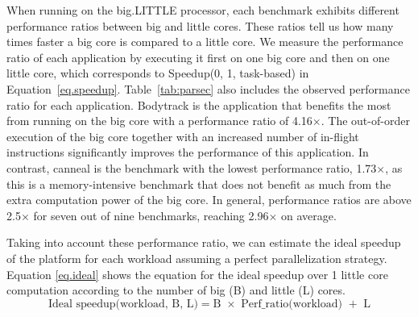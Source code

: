 When running on the big.LITTLE processor, each benchmark exhibits different performance ratios between big and little cores. These ratios tell us how many times faster a big core is compared to a little core. We measure the performance ratio of each application by executing it first on one big core and then on one little core, which corresponds to Speedup(0, 1, task-based) in Equation~\ref{eq.speedup}. 
Table~\ref{tab:parsec} also includes the observed performance ratio for each application. Bodytrack is the application that benefits the most from running on the big core with a performance ratio of 4.16$\times$. The out-of-order execution of the big core together with an increased number of in-flight instructions significantly improves the performance of this application. In contrast, canneal is the benchmark with the lowest performance ratio, 1.73$\times$, as this is a memory-intensive benchmark that does not benefit as much from the extra computation power of the big core. In general, performance ratios are above 2.5$\times$ for seven out of nine benchmarks, reaching 2.96$\times$ on average. 


Taking into account these performance ratio, we can estimate the ideal speedup of the platform for 
each workload assuming a perfect parallelization strategy. Equation \ref{eq.ideal} shows the 
equation for the ideal speedup over 1 little core computation according to the number of big (B) and 
little (L) cores.
\begingroup\makeatletter\def\f@size{8}\check@mathfonts
\begin{equation}
  \text{Ideal speedup(workload, B, L)} = \text{B $\times$ Perf\_ratio(workload) $+$ L}
\label{eq.ideal}
\end{equation}
\endgroup

